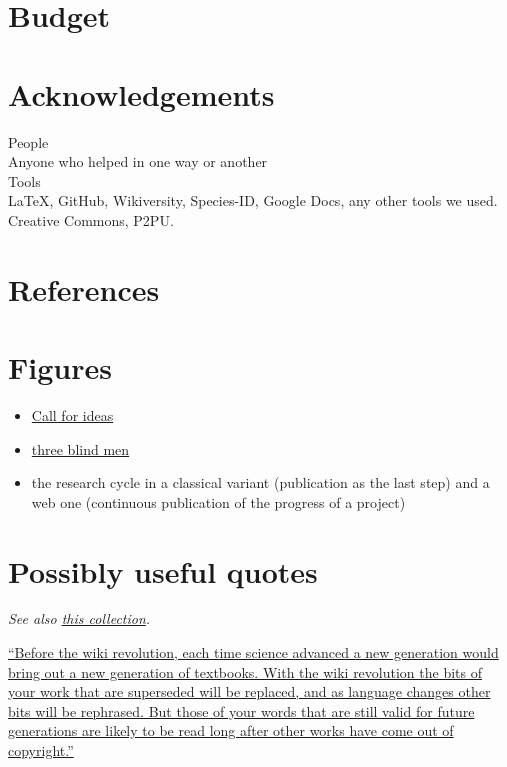 \documentclass[final,authoryear,3p]{elsarticle-open-drafting}
\begin{document}
\section{Budget}
\section{Acknowledgements}
People\\
Anyone who helped in one way or another\\

Tools\\
\LaTeX, GitHub, Wikiversity, Species-ID, Google Docs, any other tools we used.
Creative Commons, P2PU.

\section{References}


 


\section{Figures}
\begin{itemize}
	\item \href{http://www.science3point0.com/evomri/2011/06/08/drafting-proposals-in-the-open-entering-illustrations/}{Call for ideas}
	\item \href{http://www.science3point0.com/evomri/2011/06/15/the-blind-men-and-the-elephant-open-science-version/}{three blind men}
	\item the research cycle in a classical variant (publication as the last step) and a web one (continuous publication of the progress of a project)
\end{itemize}

\section{Possibly useful quotes}
{\it See also \href{http://www.science3point0.com/coaspedia/index.php/User:Daniel_Mietchen/Talks/Slides/Quotes}{this collection}.}

\href{http://ragesoss.com/blog/2006/11/20/top-10-reasons-why-academics-should-edit-wikipedia/comment-page-1/#comment-17727}{``Before the wiki revolution, each time science advanced a new generation would bring out a new generation of textbooks. With the wiki revolution the bits of your work that are superseded will be replaced, and as language changes other bits will be rephrased. But those of your words that are still valid for future generations are likely to be read long after other works have come out of copyright.''}
\end{document}

